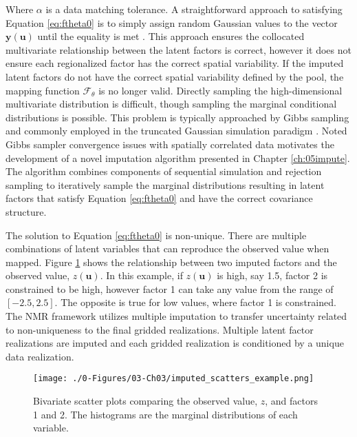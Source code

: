 Where $\alpha$ is a data matching tolerance. A straightforward approach to satisfying Equation \ref{eq:ftheta0} is to simply assign random Gaussian values to the vector $\mathbf{y}(\mathbf{u})$ until the equality is met \citep{silva2018enhanced}. This approach ensures the collocated multivariate relationship between the latent factors is correct, however it does not ensure each regionalized factor has the correct spatial variability. If the imputed latent factors do not have the correct spatial variability defined by the pool, the mapping function $\mathcal{F}_{\theta}$ is no longer valid. Directly sampling the high-dimensional multivariate distribution is difficult, though sampling the marginal conditional distributions is possible. This problem is typically approached by Gibbs sampling \citep{geman1984stochastic} and commonly employed in the truncated Gaussian simulation paradigm \citep{arroyo2020iterative,madani2021enhanced}. Noted Gibbs sampler convergence issues with spatially correlated data motivates the development of a novel imputation algorithm presented in Chapter \ref{ch:05impute}. The algorithm combines components of sequential simulation and rejection sampling to iteratively sample the marginal distributions resulting in latent factors that satisfy Equation \ref{eq:ftheta0} and have the correct covariance structure.

The solution to Equation \ref{eq:ftheta0} is non-unique. There are multiple combinations of latent variables that can reproduce the observed value when mapped. Figure \ref{fig:imputed_scatters_example} shows the relationship between two imputed factors and the observed value, $z(\mathbf{u})$. In this example, if $z(\mathbf{u})$ is high, say 1.5, factor 2 is constrained to be high, however factor 1 can take any value from the range of $[-2.5, 2.5]$. The opposite is true for low values, where factor 1 is constrained. The \gls{NMR} framework utilizes multiple imputation to transfer uncertainty related to non-uniqueness to the final gridded realizations. Multiple latent factor realizations are imputed and each gridded realization is conditioned by a unique data realization.

\begin{figure}[htb!]
    \centering
    \texttt{[image: ./0-Figures/03-Ch03/imputed\_scatters\_example.png]}
    \caption{Bivariate scatter plots comparing the observed value, $z$, and factors 1 and 2. The histograms are the marginal distributions of each variable. }
    \label{fig:imputed_scatters_example}
\end{figure}

